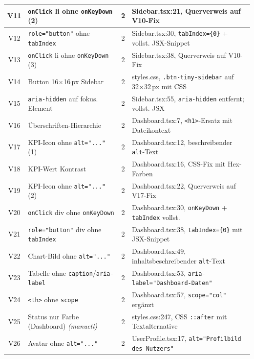 \begin{longtable}{|c|p{5.2cm}|c|p{5.8cm}|}
\hline
V11 & \texttt{onClick} li ohne \texttt{onKeyDown} (2) & 2 & Sidebar.tsx:21, Querverweis auf V10-Fix \\
\hline
V12 & \texttt{role="button"} ohne \texttt{tabIndex} & 2 & Sidebar.tsx:30, \texttt{tabIndex=\{0\}} + vollst. \ac{JSX}-Snippet \\
\hline
V13 & \texttt{onClick} li ohne \texttt{onKeyDown} (3) & 2 & Sidebar.tsx:38, Querverweis auf V10-Fix \\
\hline
V14 & Button 16×16\,px Sidebar                    & 2 & styles.css, \texttt{.btn-tiny-sidebar} auf 32×32\,px mit \ac{CSS} \\
\hline
V15 & \texttt{aria-hidden} auf fokus. Element      & 2 & Sidebar.tsx:55, \texttt{aria-hidden} entfernt; vollst. \ac{JSX} \\
\hline
V16 & Überschriften-Hierarchie                     & 2 & Dashboard.tsx:7, \texttt{<h1>}-Ersatz mit Dateikontext \\
\hline
V17 & \ac{KPI}-Icon ohne \texttt{alt="..."} (1)               & 2 & Dashboard.tsx:12, beschreibender \texttt{alt}-Text \\
\hline
V18 & \ac{KPI}-Wert Kontrast                            & 2 & Dashboard.tsx:16, \ac{CSS}-Fix mit Hex-Farben \\
\hline
V19 & \ac{KPI}-Icon ohne \texttt{alt="..."} (2)               & 2 & Dashboard.tsx:22, Querverweis auf V17-Fix \\
\hline
V20 & \texttt{onClick} div ohne \texttt{onKeyDown} & 2 & Dashboard.tsx:30, \texttt{onKeyDown} + \texttt{tabIndex} vollst. \\
\hline
V21 & \texttt{role="button"} div ohne \texttt{tabIndex} & 2 & Dashboard.tsx:38, \texttt{tabIndex=\{0\}} mit \ac{JSX}-Snippet \\
\hline
V22 & Chart-Bild ohne \texttt{alt="..."}                 & 2 & Dashboard.tsx:49, inhaltsbeschreibender \texttt{alt}-Text \\
\hline
V23 & Tabelle ohne \texttt{caption}/\texttt{aria-label} & 2 & Dashboard.tsx:53, \texttt{aria-label="Dashboard-Daten"} \\
\hline
V24 & \texttt{<th>} ohne \texttt{scope}            & 2 & Dashboard.tsx:57, \texttt{scope="col"} ergänzt \\
\hline
V25 & Status nur Farbe (Dashboard) \textit{(manuell)} & 2 & styles.css:247, \ac{CSS} \texttt{::after} mit Textalternative \\
\hline
V26 & Avatar ohne \texttt{alt="..."}                     & 2 & UserProfile.tsx:17, \texttt{alt="Profilbild des Nutzers"} \\

\end{longtable}
